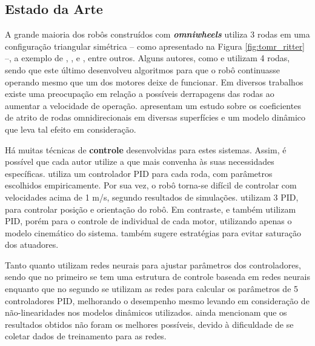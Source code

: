 \subsection{Estado da Arte}

A grande maioria dos robôs construídos com \textbf{\emph{omniwheels}} utiliza 3 rodas em uma configuração triangular simétrica -- como apresentado na Figura \ref{fig:tomr_ritter} --, a exemplo de \cite{ritter2016modelagem}, \cite{samani2007comprehensive}, \cite{williams2002dynamic} e \cite{indiveri2009swedish}, entre outros. Alguns autores, como \cite{krinkin2015design} e \cite{rojas2006holonomic} utilizam 4 rodas, sendo que este último desenvolveu algoritmos para que o robô continuasse operando mesmo que um dos motores deixe de funcionar. Em diversos trabalhos existe uma preocupação em relação a possíveis derrapagens das rodas ao aumentar a velocidade de operação. \cite{williams2002dynamic} apresentam um estudo sobre os coeficientes de atrito de rodas omnidirecionais em diversas superfícies e um modelo dinâmico que leva tal efeito em consideração.

Há muitas técnicas de \textbf{controle} desenvolvidas para estes sistemas. Assim, é possível que cada autor utilize a que mais convenha às suas necessidades específicas. \cite{ritter2016modelagem} utiliza um controlador PID para cada roda, com parâmetros escolhidos empiricamente. Por sua vez, o robô torna-se difícil de controlar com velocidades acima de 1 m/s, segundo resultados de simulações. \cite{samani2007comprehensive} utilizam 3 PID, para controlar posição e orientação do robô. Em contraste, \cite{rojas2006holonomic} e \cite{indiveri2009swedish} também utilizam PID, porém para o controle de individual de cada motor, utilizando apenas o modelo cinemático do sistema. \cite{indiveri2009swedish} também sugere estratégias para evitar saturação dos atuadores.

Tanto \cite{treesatayapun2011discrete} quanto \cite{oubbati2005velocity} utilizam redes neurais para ajustar parâmetros dos controladores, sendo que no primeiro se tem uma estrutura de controle baseada em redes neurais enquanto que no segundo se utilizam as redes para calcular os parâmetros de 5 controladores PID, melhorando o desempenho mesmo levando em consideração de não-linearidades nos modelos dinâmicos utilizados. \cite{oubbati2005velocity} ainda mencionam que os resultados obtidos não foram os melhores possíveis, devido à dificuldade de se coletar dados de treinamento para as redes.

